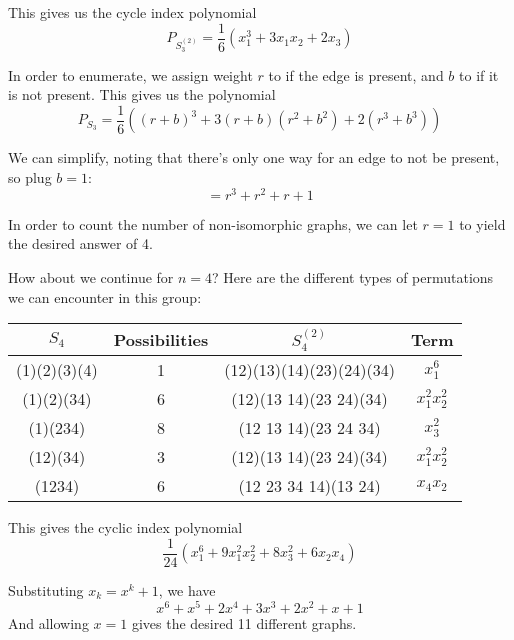\documentclass[11pt,twosided]{article}
\begin{document}
This gives us the cycle index polynomial 
\[
	P_{S_3^{(2)}} = \frac{1}{6} (x_1^3 + 3x_1 x_2 + 2x_3) 
\]

In order to enumerate, we assign weight $r$ to if the edge is present, and $b$ to if it is not present. This gives us the polynomial 
\[
	P_{S_3} = \frac{1}{6}( (r+b)^3 + 3(r+b)(r^2+b^2) + 2(r^3 + b^3))
\]

We can simplify, noting that there's only one way for an edge to not be present, so plug $b = 1$: 
\[
	 = r^3 + r^2 + r + 1
\]

In order to count the number of non-isomorphic graphs, we can let $r = 1$ to yield the desired answer of 4. 

How about we continue for $n = 4$? Here are the different types of permutations we can encounter in this group: 

\begin{center}
\begin{tabular}{c | c | c | c}
 $S_4$ & Possibilities & $S_4^{(2)}$ & Term \\ \hline
(1)(2)(3)(4) & 1 & (12)(13)(14)(23)(24)(34) & $x_1^6$ \\
(1)(2)(34) & 6 & (12)(13 14)(23 24)(34) & $x_1^2 x_2^2$ \\
(1)(234) & 8 & (12 13 14)(23 24 34) & $ x_3^2 $\\
(12)(34) & 3 & (12)(13 14)(23 24)(34) & $x_1^2 x_2^2 $\\
(1234) & 6 & (12 23 34 14)(13 24) & $x_4 x_2$ \\

\end{tabular}
\end{center}

This gives the cyclic index polynomial 
\[
	\frac{1}{24} (x_1^6 + 9 x_1^2 x_2^2 + 8 x_3^2 + 6 x_2 x_4)
\]

Substituting $x_k = x^k + 1$, we have 
\[
	x^6 + x^5 + 2x^4 + 3x^3 + 2x^2 + x + 1 
\]
And allowing $x = 1$ gives the desired 11 different graphs. 
\end{document}
